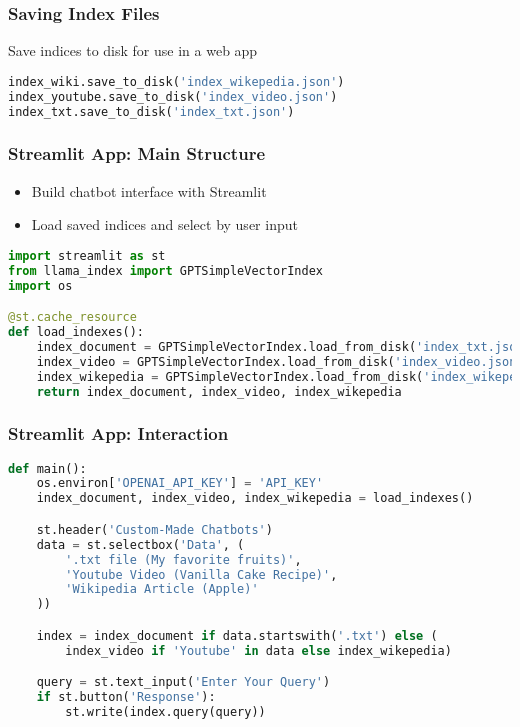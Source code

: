 \begin{frame}[fragile]\frametitle{Saving Index Files}

Save indices to disk for use in a web app

\begin{lstlisting}[language=Python]
index_wiki.save_to_disk('index_wikepedia.json')
index_youtube.save_to_disk('index_video.json')
index_txt.save_to_disk('index_txt.json')
\end{lstlisting}
\end{frame}

\begin{frame}[fragile]\frametitle{Streamlit App: Main Structure}
    \begin{itemize}
        \item Build chatbot interface with Streamlit
        \item Load saved indices and select by user input
    \end{itemize}
\begin{lstlisting}[language=Python]
import streamlit as st
from llama_index import GPTSimpleVectorIndex
import os

@st.cache_resource
def load_indexes():
    index_document = GPTSimpleVectorIndex.load_from_disk('index_txt.json')
    index_video = GPTSimpleVectorIndex.load_from_disk('index_video.json')
    index_wikepedia = GPTSimpleVectorIndex.load_from_disk('index_wikepedia.json')
    return index_document, index_video, index_wikepedia
\end{lstlisting}
\end{frame}

\begin{frame}[fragile]\frametitle{Streamlit App: Interaction}
\begin{lstlisting}[language=Python]
def main():
    os.environ['OPENAI_API_KEY'] = 'API_KEY'
    index_document, index_video, index_wikepedia = load_indexes()

    st.header('Custom-Made Chatbots')
    data = st.selectbox('Data', (
        '.txt file (My favorite fruits)', 
        'Youtube Video (Vanilla Cake Recipe)', 
        'Wikipedia Article (Apple)'
    ))

    index = index_document if data.startswith('.txt') else (
        index_video if 'Youtube' in data else index_wikepedia)

    query = st.text_input('Enter Your Query')
    if st.button('Response'):
        st.write(index.query(query))
\end{lstlisting}
\end{frame}

